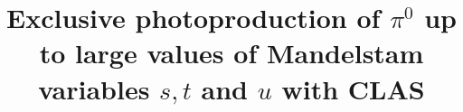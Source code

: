 \documentclass[aps,prc,twocolumn,floatfix,showpacs,preprintnumbers,amsmath,amssymb,superscriptaddress,linenumbers]{revtex4-1}
\def\epemT{$ e^+e^-  $}
\begin{document}
\preprint{}

\title{Exclusive photoproduction of $\pi^0$ up to large values of Mandelstam variables $s, t$ and $u$ with CLAS}

\newcommand*{\ODU}{Old Dominion University, Norfolk, VA 23529, USA}
\newcommand*{\IKP}{Institut f\"ur Kernphysik, Forschungszentrum J\"ulich, 
	52424 J\"ulich, Germany}
\newcommand*{\BOCHUM}{Institut f\"ur Experimentalphysik I, Ruhr-–Universit\"at 
	Bochum, 44780 Bochum, Germany}
\newcommand*{\JARA}{ JARA–FAME, J\"ulich Aachen Research Alliance, 
	Forschungszentrum J\"ulich, 52425 J\"ulich, and RWTH Aachen, 52056 
	Aachen, Germany}
\newcommand*{\KYUNGPOOK} {Kyungpook National University, 702-701, Daegu, 
	Republic of Korea}
\newcommand*{\INR}{Institute for Nuclear Research, 117312, Moscow, Russia}
\newcommand*{\CUA}{Catholic University of America, Washington, DC 20064} 
\newcommand*{\JLAB}{Thomas Jefferson National Accelerator Facility, Newport 
	News, VA 23606}
\newcommand*{\UVA}{University of Virginia, Charlottesville, VA 22904, USA}
\newcommand*{\CMU}{Carnegie Mellon University, Pittsburg, PA 15213, USA}
\end{document}
